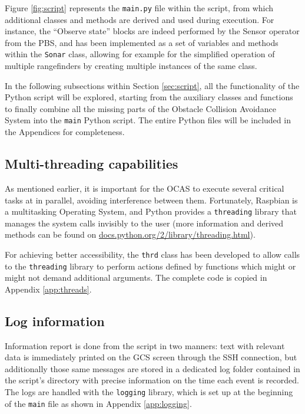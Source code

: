 

Figure \ref{fig:script} represents the \texttt{main.py} file within the script, from which additional classes and methods are derived and used during execution.
For instance, the ``Observe state'' blocks are indeed performed by the Sensor operator from the PBS, and has been implemented as a set of variables and methods within the \texttt{Sonar} class, allowing for example for the simplified operation of multiple rangefinders by creating multiple instances of the same class.

In the following subsections within Section \ref{sec:script}, all the functionality of the Python script will be explored, starting from the auxiliary classes and functions to finally combine all the missing parts of the Obstacle Collision Avoidance System into the \texttt{main} Python script.
The entire Python files will be included in the Appendices for completeness.

\subsection{Multi-threading capabilities}

As mentioned earlier, it is important for the OCAS to execute several critical tasks at in parallel, avoiding interference between them.
Fortunately, Raspbian is a multitasking Operating System, and Python provides a \texttt{threading} library that manages the system calls invisibly to the user (more information and derived methods can be found on \url{docs.python.org/2/library/threading.html}).

For achieving better accessibility, the \texttt{thrd} class has been developed to allow calls to the \texttt{threading} library to perform actions defined by functions which might or might not demand additional arguments.
The complete code is copied in Appendix \ref{app:threads}.

\subsection{Log information} \label{sec:logging}

Information report is done from the script in two manners:
text with relevant data is immediately printed on the GCS screen through the SSH connection, but additionally those same messages are stored in a dedicated log folder contained in the script's directory with precise information on the time each event is recorded.
The logs are handled with the \texttt{logging} library, which is set up at the beginning of the \texttt{main} file as shown in Appendix \ref{app:logging}.

